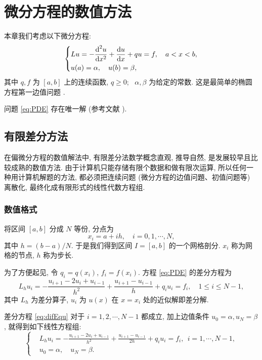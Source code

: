 

\chapter{微分方程的数值方法}

本章我们考虑以下微分方程:
\begin{equation}\label{eq:PDE}
\left\{\begin{aligned}
& Lu=-\frac{{\mathop{}\!\mathrm{d}}^{2} u}{\mathop{}\!\mathrm{d} x^{2}}+\frac{\mathop{}\!\mathrm{d} u}{\mathop{}\!\mathrm{d} x}+qu=f, \quad a < x < b, \\
& u(a)=\alpha, \quad u(b)=\beta,
\end{aligned}\right.
\end{equation}
其中 $q, f$ 为 $[a,b]$ 上的连续函数, $q \geqslant 0$;~ $\alpha, \beta$ 为给定的常数. 这是最简单的椭圆方程第一边值问题 .

问题 \eqref{eq:PDE} 存在唯一解 (参考文献 \cite{LiLiu1997}).


\section{有限差分方法}
在偏微分方程的数值解法中, 有限差分法数学概念直观, 推导自然, 是发展较早且比较成熟的数值方法. 由于计算机只能存储有限个数据和做有限次运算, 所以任何一种用计算机解题的方法, 都必须把连续问题 (微分方程的边值问題、初值问题等) 离散化, 最终化成有限形式的线性代数方程组.

\subsection{数值格式}
将区间 $[a,b]$ 分成 $N$ 等份, 分点为
\begin{equation*}
  x_{i} = a+ih, \quad i=0,1, \cdots, N,
\end{equation*}
其中 $h=(b-a)/N$. 于是我们得到区间 $I=[a,b]$ 的一个网格剖分. $x_i$ 称为网格的节点, $h$ 称为步长.

为了方便起见, 令 $q_{i}=q(x_{i})$, $f_{i}=f(x_{i})$. 方程 \eqref{eq:PDE} 的差分方程为
\begin{equation}\label{eq:difEqu}
  L_{h} u_{i}=-\frac{u_{i+1}-2 u_{i}+u_{i-1}}{h^{2}}+\frac{u_{i+1}-u_{i-1}}{h}+q_{i} u_{i}=f_{i},\quad 1 \leqslant i \leqslant N-1,
\end{equation}
其中 $L_{h}$ 为差分算子, $u_i$ 为 $u(x)$ 在 $x=x_i$ 处的近似解即差分解.

差分方程 \eqref{eq:difEqu} 对于 $i=1,2, \cdots, N-1$ 都成立, 加上边值条件 $u_{0}=\alpha, u_{N}=\beta$, 就得到如下线性方程组:
\begin{equation}\label{eq:fdm}
\left\{\begin{aligned}
& L_{h} u_{i}=-\frac{u_{i+1}-2 u_{i}+u_{i-1}}{h^{2}}+\frac{u_{i+1}-u_{i-1}}{2h}+q_{i} u_{i}=f_{i}, ~~ i=1, \cdots, N-1, \\
& u_{0}=\alpha, \quad u_{N}=\beta.
\end{aligned}\right.
\end{equation}

